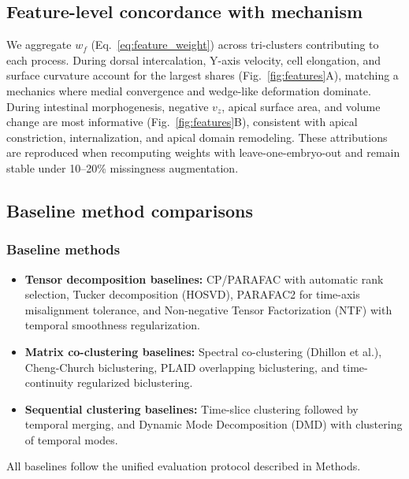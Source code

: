 \documentclass[unnumsec,webpdf,modern,large,namedate]{oup-authoring-template}%
\theoremstyle{thmstyleone}\newtheorem{theorem}{Theorem}
\theoremstyle{thmstyletwo}\newtheorem{example}{Example}
\theoremstyle{thmstylethree}\newtheorem{definition}{Definition}
\begin{document}
\subsection{Feature-level concordance with mechanism}
\label{subsec:val_features}
We aggregate $w_f$ (Eq.~\ref{eq:feature_weight}) across tri-clusters contributing to each process. During dorsal intercalation, Y-axis velocity, cell elongation, and surface curvature account for the largest shares (Fig.~\ref{fig:features}A), matching a mechanics where medial convergence and wedge-like deformation dominate. During intestinal morphogenesis, negative $v_z$, apical surface area, and volume change are most informative (Fig.~\ref{fig:features}B), consistent with apical constriction, internalization, and apical domain remodeling. These attributions are reproduced when recomputing weights with leave-one-embryo-out and remain stable under 10–20\% missingness augmentation.

\subsection{Baseline method comparisons}

\subsubsection{Baseline methods}
\begin{itemize}
\item \textbf{Tensor decomposition baselines:} CP/PARAFAC with automatic rank selection, Tucker decomposition (HOSVD), PARAFAC2 for time-axis misalignment tolerance, and Non-negative Tensor Factorization (NTF) with temporal smoothness regularization.
\item \textbf{Matrix co-clustering baselines:} Spectral co-clustering (Dhillon et al.), Cheng-Church biclustering, PLAID overlapping biclustering, and time-continuity regularized biclustering.
\item \textbf{Sequential clustering baselines:} Time-slice clustering followed by temporal merging, and Dynamic Mode Decomposition (DMD) with clustering of temporal modes.
\end{itemize}
All baselines follow the unified evaluation protocol described in Methods.
\end{document}

